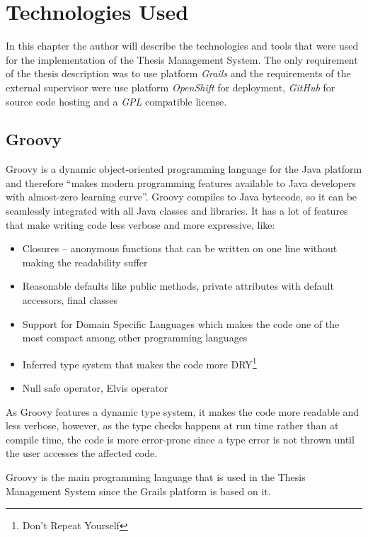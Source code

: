 \chapter{Technologies Used}

In this chapter the author will describe the technologies and tools that were used for the implementation of the Thesis Management System. The only requirement of the thesis description was to use platform \emph{Grails} and the requirements of the external supervisor were use platform \emph{OpenShift} for deployment, \emph{GitHub} for source code hosting and a \emph{GPL} compatible license.

\section{Groovy}

Groovy is a dynamic object-oriented programming language for the Java platform and therefore ``makes modern programming features available to Java developers with almost-zero learning curve''\cite{groovy-homepage}. Groovy compiles to Java bytecode, so it can be seamlessly integrated with all Java classes and libraries\cite{groovy-homepage}. It has a lot of features that make writing code less verbose and more expressive, like:

\begin{itemize}
    \item Closures -- anonymous functions that can be written on one line without making the readability suffer
    \item Reasonable defaults like public methods, private attributes with default accessors, final classes
    \item Support for Domain Specific Languages which makes the code one of the most compact among other programming languages
    \item Inferred type system that makes the code more DRY\footnote{Don't Repeat Yourself}
    \item Null safe operator, Elvis operator
\end{itemize}

As Groovy features a dynamic type system, it makes the code more readable and less verbose, however, as the type checks happens at run time rather than at compile time, the code is more error-prone since a type error is not thrown until the user accesses the affected code.

Groovy is the main programming language that is used in the Thesis Management System since the Grails platform is based on it.

